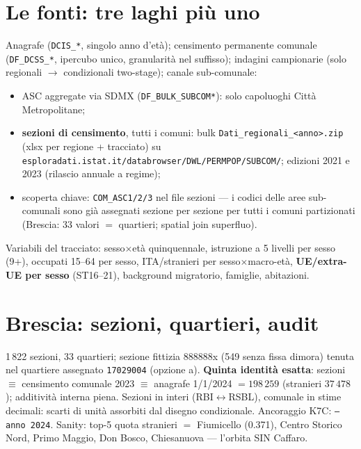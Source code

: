 \documentclass[11pt,a4paper]{article}
\newcommand{\code}[1]{\texttt{#1}}
\newcommand{\flow}[1]{\texttt{\small #1}}
\begin{document}
\section{Le fonti: tre laghi pi\`u uno}
\label{sec:laghi}
Anagrafe (\flow{DCIS\_*}, singolo anno d'et\`a); censimento permanente
comunale (\flow{DF\_DCSS\_*}, ipercubo unico, granularit\`a nel suffisso);
indagini campionarie (solo regionali $\to$ condizionali two-stage); canale
sub-comunale:
\begin{itemize}[leftmargin=*,itemsep=1pt]
  \item ASC aggregate via SDMX (\flow{DF\_BULK\_SUBCOM*}): solo capoluoghi
  Citt\`a Metropolitane;
  \item \textbf{sezioni di censimento}, tutti i comuni: bulk
  \code{Dati\_regionali\_<anno>.zip} (xlsx per regione + tracciato) su
  \code{esploradati.istat.it/databrowser/DWL/PERMPOP/SUBCOM/}; edizioni 2021
  e 2023 (rilascio annuale a regime);
  \item scoperta chiave: \code{COM\_ASC1/2/3} nel file sezioni --- i codici
  delle aree sub-comunali sono gi\`a assegnati sezione per sezione per tutti
  i comuni partizionati (Brescia: 33 valori $=$ quartieri; spatial join
  superfluo).
\end{itemize}
Variabili del tracciato: sesso$\times$et\`a quinquennale, istruzione a 5
livelli per sesso (9+), occupati 15--64 per sesso, ITA/stranieri per
sesso$\times$macro-et\`a, \textbf{UE/extra-UE per sesso} (ST16--21),
background migratorio, famiglie, abitazioni.

\section{Brescia: sezioni, quartieri, audit}
1\,822 sezioni, 33 quartieri; sezione fittizia 888888x (549 senza fissa
dimora) tenuta nel quartiere assegnato \code{17029004} (opzione a).
\textbf{Quinta identit\`a esatta}: sezioni $\equiv$ censimento comunale 2023
$\equiv$ anagrafe 1/1/2024 $= 198\,259$ (stranieri $37\,478$); additivit\`a
interna piena. Sezioni in interi (RBI$\leftrightarrow$RSBL), comunale in
stime decimali: scarti di unit\`a assorbiti dal disegno condizionale.
Ancoraggio K7C: \code{--anno 2024}. Sanity: top-5 quota stranieri $=$
Fiumicello (0.371), Centro Storico Nord, Primo Maggio, Don Bosco,
Chiesanuova --- l'orbita SIN Caffaro.

\end{document}
